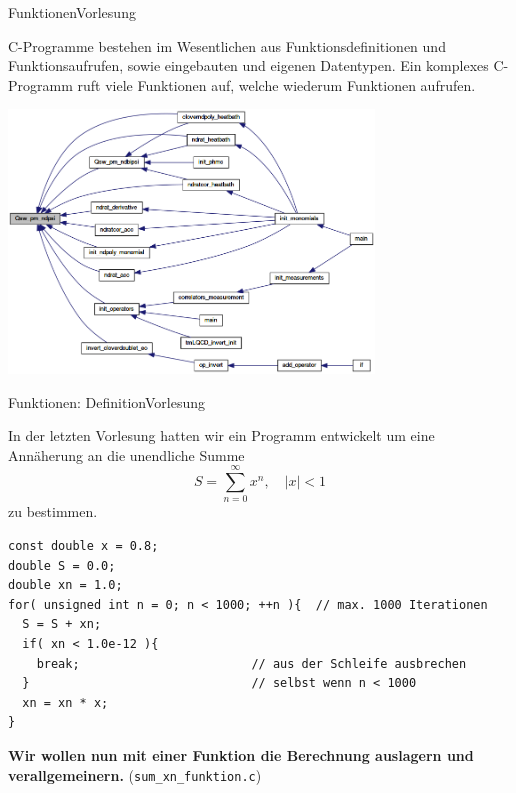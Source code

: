 \documentclass[xcolor=dvipsnames]{beamer}
\newcounter{lecturecounter}
\begin{document}
\begin{frame}[fragile]{Funktionen}{Vorlesung }
  \begin{block}{}
    C-Programme bestehen im Wesentlichen aus Funktionsdefinitionen und Funktionsaufrufen, sowie eingebauten und eigenen Datentypen. Ein komplexes C-Programm ruft viele Funktionen auf, welche wiederum Funktionen aufrufen.
  \end{block}
  \centering
  \includegraphics[height=7cm]{graphics/call_graph}
\end{frame}

\begin{frame}[fragile]{Funktionen: Definition}{Vorlesung }
\begin{block}{}
In der letzten Vorlesung hatten wir ein Programm entwickelt um eine Annäherung an die unendliche Summe
\begin{equation*}
  S=\sum_{n=0}^\infty x^n, \quad |x| < 1
\end{equation*}
zu bestimmen.
\end{block}
\begin{lstlisting}
const double x = 0.8;
double S = 0.0;
double xn = 1.0;
for( unsigned int n = 0; n < 1000; ++n ){  // max. 1000 Iterationen
  S = S + xn;
  if( xn < 1.0e-12 ){
    break;                        // aus der Schleife ausbrechen
  }                               // selbst wenn n < 1000
  xn = xn * x;
}
\end{lstlisting}
\textbf{Wir wollen nun mit einer Funktion die Berechnung auslagern und verallgemeinern.} (\verb|sum_xn_funktion.c|)
\end{frame}
\end{document}
